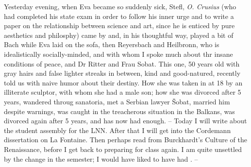 Yesterday evening, when Eva became so suddenly sick, Stefl, \textit{O. Crusius} (who had completed his state exam in order to follow his inner urge and to write a paper on the relationship between science and art, since he is enticed by pure aesthetics and philosphy) came by and, in his thoughtful way, played a bit of Bach while Eva laid on the sofa, then Reyersbach and Heilbronn, who is idealistically socially-minded, and with whom I spoke much about thr insane conditions of peace, and Dr Ritter and Frau Sobat. This one, 50 years old with gray hairs and false lighter streaks in between, kind and good-natured, recently told us with naive humor about their destiny. How she was taken in at 18 by an illiterate sculptor, with whom she had a male son; how she was divorced after 5 years, wandered throug sanatoria,  met a Serbian lawyer Šobat, married him despite warnings, was caught in the treacherous situation in the Balkans, was divorced again after 5 years, and has now had enough. -- Today I will write about the student assembly for the LNN. After that I will get into the Cordemann dissertation on La Fontaine. Then perhaps read from Burckhardt's Culture of the Renaissance, before I get back to preparing for class again. I am quite unsettled by the change in the semester; I would have liked to have had . --

